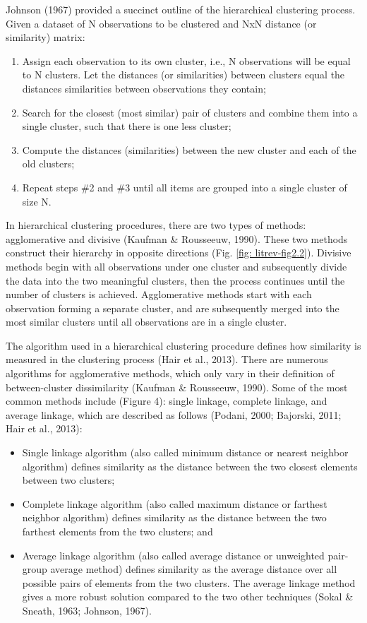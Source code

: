 Johnson (1967) provided a succinct outline of the hierarchical clustering process. Given a dataset of N observations to be clustered and NxN distance (or similarity) matrix:

\begin{enumerate}
	\item Assign each observation to its own cluster, i.e., N observations will be equal to N clusters. Let the distances (or similarities) between clusters equal the distances similarities between observations they contain;
	\item Search for the closest (most similar) pair of clusters and combine them into a single cluster, such that there is one less cluster;
	\item Compute the distances (similarities) between the new cluster and each of the old clusters;
	\item Repeat steps \#2 and \#3 until all items are grouped into a single cluster of size N.
\end{enumerate}

In hierarchical clustering procedures, there are two types of methods: agglomerative and divisive (Kaufman \& Rousseeuw, 1990). These two methods construct their hierarchy in opposite directions (Fig. \ref{fig: litrev-fig2.2}). Divisive methods begin with all observations under one cluster and subsequently divide the data into the two meaningful clusters, then the process continues until the number of clusters is achieved. Agglomerative methods start with each observation forming a separate cluster, and are subsequently merged into the most similar clusters until all observations are in a single cluster.

The algorithm used in a hierarchical clustering procedure defines how similarity is measured in the clustering process (Hair et al., 2013). There are numerous algorithms for agglomerative methods, which only vary in their definition of between-cluster dissimilarity (Kaufman \& Rousseeuw, 1990). Some of the most common methods include (Figure 4): single linkage, complete linkage, and average linkage, which are described as follows (Podani, 2000; Bajorski, 2011; Hair et al., 2013):

\begin{itemize}
	\item Single linkage algorithm (also called minimum distance or nearest neighbor algorithm) defines similarity as the distance between the two closest elements between two clusters;
	\item Complete linkage algorithm (also called maximum distance or farthest neighbor algorithm) defines similarity as the distance between the two farthest elements from the two clusters; and
	\item Average linkage algorithm (also called average distance or unweighted pair-group average method) defines similarity as the average distance over all possible pairs of elements from the two clusters. The average linkage method gives a more robust solution compared to the two other techniques (Sokal \& Sneath, 1963; Johnson, 1967).
\end{itemize}

